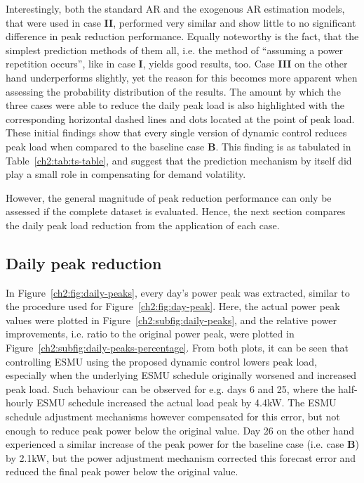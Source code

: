 Interestingly, both the standard AR and the exogenous AR estimation models, that were used in case \textbf{II}, performed very similar and show little to no significant difference in peak reduction performance.
Equally noteworthy is the fact, that the simplest prediction methods of them all, i.e. the method of ``assuming a power repetition occurs'', like in case \textbf{I}, yields good results, too.
Case \textbf{III} on the other hand underperforms slightly, yet the reason for this becomes more apparent when assessing the probability distribution of the results.
The amount by which the three cases were able to reduce the daily peak load is also highlighted with the corresponding horizontal dashed lines and dots located at the point of peak load.
These initial findings show that every single version of dynamic control reduces peak load when compared to the baseline case \textbf{B}.
This finding is as tabulated in Table~\ref{ch2:tab:ts-table}, and suggest that the prediction mechanism by itself did play a small role in compensating for demand volatility.



However, the general magnitude of peak reduction performance can only be assessed if the complete dataset is evaluated.
Hence, the next section compares the daily peak load reduction from the application of each case.

\subsection{Daily peak reduction}



In Figure~\ref{ch2:fig:daily-peaks}, every day's power peak was extracted, similar to the procedure used for Figure~\ref{ch2:fig:day-peak}.
Here, the actual power peak values were plotted in Figure~\ref{ch2:subfig:daily-peaks}, and the relative power improvements, i.e. ratio to the original power peak, were plotted in Figure~\ref{ch2:subfig:daily-peaks-percentage}.
From both plots, it can be seen that controlling ESMU using the proposed dynamic control lowers peak load, especially when the underlying ESMU schedule originally worsened and increased peak load.
Such behaviour can be observed for e.g. days 6 and 25, where the half-hourly ESMU schedule increased the actual load peak by 4.4kW.
The ESMU schedule adjustment mechanisms however compensated for this error, but not enough to reduce peak power below the original value.
Day 26 on the other hand experienced a similar increase of the peak power for the baseline case (i.e. case \textbf{B}) by 2.1kW, but the power adjustment mechanism corrected this forecast error and reduced the final peak power below the original value.

